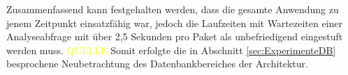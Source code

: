     \noindent Zusammenfassend kann festgehalten werden, dass die gesamte Anwendung zu jenem Zeitpunkt einsatzfähig war, jedoch die Laufzeiten mit Wartezeiten einer Analyseabfrage mit über 2,5 Sekunden pro Paket als unbefriedigend eingestuft werden muss. \textcolor{yellow}{QUELLE}
    Somit erfolgte die in Abschnitt \ref{sec:ExperimenteDB}  besprochene Neubetrachtung des Datenbankbereiches der Architektur.

